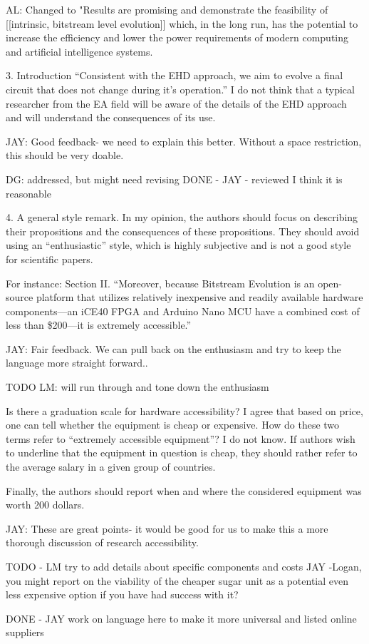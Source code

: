 AL: Changed to "Results are promising and demonstrate the feasibility of [[intrinsic, bitstream level evolution]] which, in the long run, has the potential to increase the efficiency and lower the power requirements of modern computing and artificial intelligence systems.



3. Introduction “Consistent with the EHD approach, we aim to evolve a final circuit that does not change during it’s operation.” I do not think that a typical researcher from the EA field will be aware of the details of the EHD approach and will understand the consequences of its use. 

JAY: Good feedback- we need to explain this better. Without a space restriction, this should be very doable. 


DG: addressed, but might need revising
DONE -  JAY - reviewed I think it is reasonable



4. A general style remark. In my opinion, the authors should focus on describing their propositions and the consequences of these propositions. They should avoid using an “enthusiastic” style, which is highly subjective and is not a good style for scientific papers. 

For instance: Section II. “Moreover, because Bitstream Evolution is an open-source platform that utilizes relatively inexpensive and readily available hardware components—an iCE40 FPGA and Arduino Nano MCU have a combined cost of less than \$200—it is extremely accessible.” 

JAY: Fair feedback. We can pull back on the enthusiasm and try to keep the language more straight forward..

TODO LM: will run through and tone down the enthusiasm



Is there a graduation scale for hardware accessibility? I agree that based on price, one can tell whether the equipment is cheap or expensive. How do these two terms refer to “extremely accessible equipment”? I do not know. If authors wish to underline that the equipment in question is cheap, they should rather refer to the average salary in a given group of countries. 

Finally, the authors should report when and where the considered equipment was worth 200 dollars.

JAY: These are great points- it would be good for us to make this a more thorough discussion of research accessibility.

TODO - LM try to add details about specific components and costs
JAY -Logan, you might report on the viability of the cheaper sugar unit as a potential even less expensive option if you have had success with it?


DONE - JAY work on language here to make it more universal and listed online suppliers